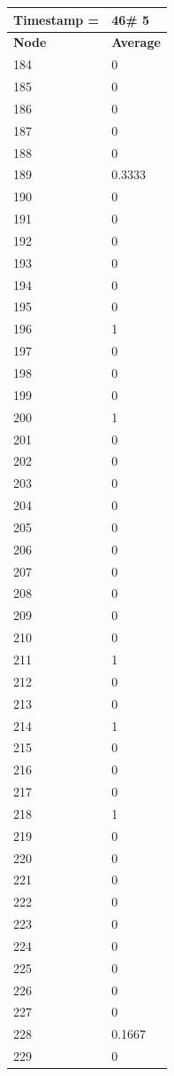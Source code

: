 \begin{tabular}{|l||l|}
\hline
\textbf{Timestamp =} & \textbf{46}\# 5\\\hline
	\textbf{Node} & \textbf{Average} \\ \hline
\hline
	184 & 0 \\ \hline
	185 & 0 \\ \hline
	186 & 0 \\ \hline
	187 & 0 \\ \hline
	188 & 0 \\ \hline
	189 & 0.3333 \\ \hline
	190 & 0 \\ \hline
	191 & 0 \\ \hline
	192 & 0 \\ \hline
	193 & 0 \\ \hline
	194 & 0 \\ \hline
	195 & 0 \\ \hline
	196 & 1 \\ \hline
	197 & 0 \\ \hline
	198 & 0 \\ \hline
	199 & 0 \\ \hline
	200 & 1 \\ \hline
	201 & 0 \\ \hline
	202 & 0 \\ \hline
	203 & 0 \\ \hline
	204 & 0 \\ \hline
	205 & 0 \\ \hline
	206 & 0 \\ \hline
	207 & 0 \\ \hline
	208 & 0 \\ \hline
	209 & 0 \\ \hline
	210 & 0 \\ \hline
	211 & 1 \\ \hline
	212 & 0 \\ \hline
	213 & 0 \\ \hline
	214 & 1 \\ \hline
	215 & 0 \\ \hline
	216 & 0 \\ \hline
	217 & 0 \\ \hline
	218 & 1 \\ \hline
	219 & 0 \\ \hline
	220 & 0 \\ \hline
	221 & 0 \\ \hline
	222 & 0 \\ \hline
	223 & 0 \\ \hline
	224 & 0 \\ \hline
	225 & 0 \\ \hline
	226 & 0 \\ \hline
	227 & 0 \\ \hline
	228 & 0.1667 \\ \hline
	229 & 0 \\ \hline
\end{tabular}
